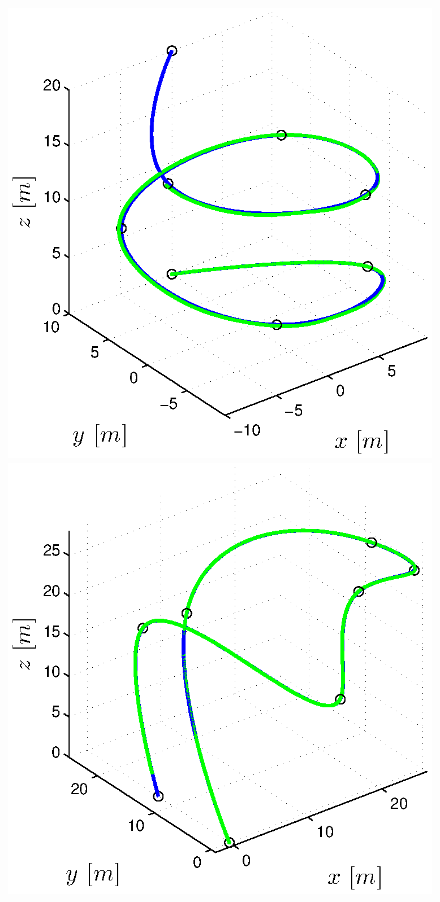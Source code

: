 \begin{figure}[h]
\begin{minipage}[t]{0.32\textwidth}
    \includegraphics[width = \textwidth]{trackings/figure_3D_helix_SplineDegree3_purePursuit_Disturbance_1}
  \end{minipage}
  \hfill
  \begin{minipage}[t]{0.32\textwidth}
    \includegraphics[width = \textwidth]{trackings/figure_3D_agile_SplineDegree3_purePursuit_Disturbance_1}

\end{minipage}
\end{figure}
